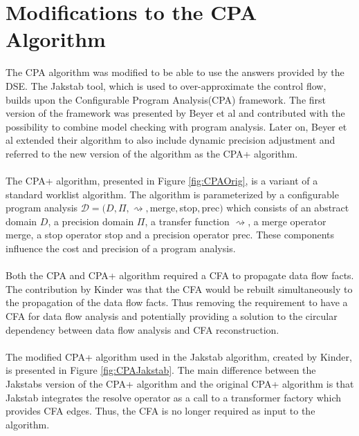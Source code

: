 \documentclass{kththesis}
\begin{document}
\section{Modifications to the CPA Algorithm}
The CPA algorithm was modified to be able to use the answers provided by the DSE. The Jakstab tool, which is used to over-approximate the control flow, builds upon the Configurable Program Analysis(CPA) framework. The first version of the framework was presented by Beyer et al\cite{cpaAlgo} and contributed with the possibility to combine model checking with program analysis. Later on, Beyer et al extended their algorithm to also include dynamic precision adjustment and referred to the new version of the algorithm as the CPA+ algorithm\cite{cpaPlusAlgo}.
\\ \\
The CPA+ algorithm, presented in Figure \ref{fig:CPAOrig}, is a variant of a standard worklist algorithm. The algorithm is parameterized by a configurable program analysis $\mathcal{D} = (D,\Pi,\rightsquigarrow,$merge$,$stop$,$prec$)$ which consists of an abstract domain $D$, a precision domain $\Pi$, a transfer function $\rightsquigarrow$, a merge operator merge, a stop operator stop and a precision operator prec. These components influence the cost and precision of a program analysis.
\\ \\
Both the CPA and CPA+ algorithm required a CFA to propagate data flow facts. The contribution by Kinder\cite{Jakstab} was that the CFA would be rebuilt simultaneously to the propagation of the data flow facts. Thus removing the requirement to have a CFA for data flow analysis and potentially providing a solution to the circular dependency between data flow analysis and CFA reconstruction.
\\ \\ 
The modified CPA+ algorithm used in the Jakstab algorithm, created by Kinder, is presented in Figure \ref{fig:CPAJakstab}. The main difference between the Jakstabs version of the CPA+ algorithm and the original CPA+ algorithm is that Jakstab integrates the resolve operator as a call to a transformer factory which provides CFA edges. Thus, the CFA is no longer required as input to the algorithm.
\end{document}
